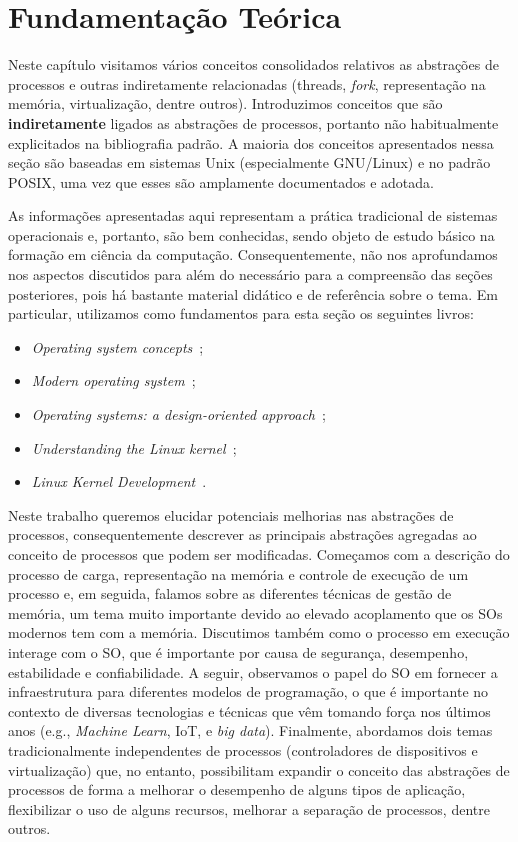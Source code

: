 \chapter{Fundamentação Teórica}
\label{cap:fundamentacao}

Neste capítulo visitamos vários conceitos consolidados relativos as abstrações
de processos e outras indiretamente relacionadas (threads, \emph{fork},
representação na memória, virtualização, dentre outros). Introduzimos
conceitos que são \textbf{indiretamente} ligados as abstrações de processos,
portanto não habitualmente explicitados na bibliografia padrão. A maioria dos
conceitos apresentados nessa seção são baseadas em sistemas Unix (especialmente
GNU/Linux) e no padrão POSIX, uma vez que esses são amplamente documentados e
adotada.

As informações apresentadas aqui representam a prática tradicional de sistemas
operacionais e, portanto, são bem conhecidas, sendo objeto de estudo básico na
formação em ciência da computação. Consequentemente, não nos aprofundamos nos
aspectos discutidos para além do necessário para a compreensão das seções
posteriores, pois há bastante material didático e de referência sobre o tema.
Em particular, utilizamos como fundamentos para esta seção os seguintes livros:

\begin{itemize}
  \item \textit{Operating system concepts}~\citep{silberschatz};
  \item \textit{Modern operating system}~\citep{tanenbaum};
  \item \textit{Operating systems: a design-oriented approach}~\citep{crowley};
  \item \textit{Understanding the Linux kernel}~\citep{entendendo_kernel};
  \item \textit{Linux Kernel Development}~\citep{love}.
\end{itemize}

Neste trabalho queremos elucidar potenciais melhorias nas abstrações de
processos, consequentemente descrever as principais abstrações agregadas ao
conceito de processos que podem ser modificadas. Começamos com a descrição do
processo de carga, representação na memória e controle de execução de um
processo e, em seguida, falamos sobre as diferentes técnicas de gestão de
memória, um tema muito importante devido ao elevado acoplamento que os SOs
modernos tem com a memória. Discutimos também como o processo em execução
interage com o SO, que é importante por causa de segurança, desempenho,
estabilidade e confiabilidade. A seguir, observamos o papel do SO em fornecer a
infraestrutura para diferentes modelos de programação, o que é importante no
contexto de diversas tecnologias e técnicas que vêm tomando força nos últimos
anos (e.g., \emph{Machine Learn}, IoT, e \emph{big data}). Finalmente,
abordamos dois temas tradicionalmente independentes de processos (controladores
de dispositivos e virtualização) que, no entanto, possibilitam expandir o
conceito das abstrações de processos de forma a melhorar o desempenho de alguns
tipos de aplicação, flexibilizar o uso de alguns recursos, melhorar a separação
de processos, dentre outros.

